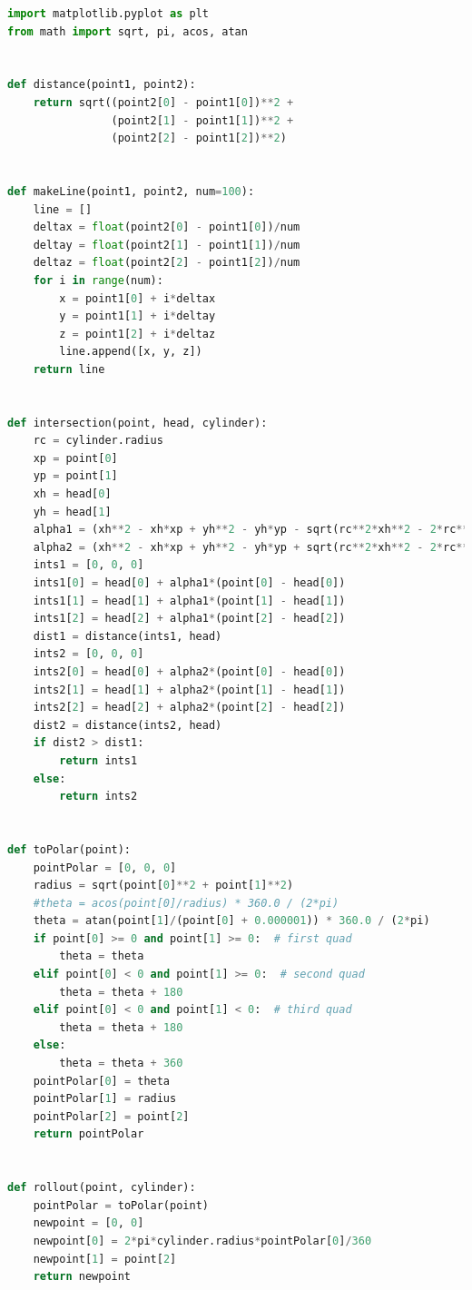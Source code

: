 \begin{lstlisting}[language=python]
import matplotlib.pyplot as plt
from math import sqrt, pi, acos, atan


def distance(point1, point2):
    return sqrt((point2[0] - point1[0])**2 +
                (point2[1] - point1[1])**2 +
                (point2[2] - point1[2])**2)


def makeLine(point1, point2, num=100):
    line = []
    deltax = float(point2[0] - point1[0])/num
    deltay = float(point2[1] - point1[1])/num
    deltaz = float(point2[2] - point1[2])/num
    for i in range(num):
        x = point1[0] + i*deltax
        y = point1[1] + i*deltay
        z = point1[2] + i*deltaz
        line.append([x, y, z])
    return line


def intersection(point, head, cylinder):
    rc = cylinder.radius
    xp = point[0]
    yp = point[1]
    xh = head[0]
    yh = head[1]
    alpha1 = (xh**2 - xh*xp + yh**2 - yh*yp - sqrt(rc**2*xh**2 - 2*rc**2*xh*xp + rc**2*xp**2 + rc**2*yh**2 - 2*rc**2*yh*yp + rc**2*yp**2 - xh**2*yp**2 + 2*xh*xp*yh*yp - xp**2*yh**2)) / (xh**2 - 2*xh*xp + xp**2 + yh**2 - 2*yh*yp + yp**2)
    alpha2 = (xh**2 - xh*xp + yh**2 - yh*yp + sqrt(rc**2*xh**2 - 2*rc**2*xh*xp + rc**2*xp**2 + rc**2*yh**2 - 2*rc**2*yh*yp + rc**2*yp**2 - xh**2*yp**2 + 2*xh*xp*yh*yp - xp**2*yh**2)) / (xh**2 - 2*xh*xp + xp**2 + yh**2 - 2*yh*yp + yp**2)
    ints1 = [0, 0, 0]
    ints1[0] = head[0] + alpha1*(point[0] - head[0])
    ints1[1] = head[1] + alpha1*(point[1] - head[1])
    ints1[2] = head[2] + alpha1*(point[2] - head[2])
    dist1 = distance(ints1, head)
    ints2 = [0, 0, 0]
    ints2[0] = head[0] + alpha2*(point[0] - head[0])
    ints2[1] = head[1] + alpha2*(point[1] - head[1])
    ints2[2] = head[2] + alpha2*(point[2] - head[2])
    dist2 = distance(ints2, head)
    if dist2 > dist1:
        return ints1
    else:
        return ints2


def toPolar(point):
    pointPolar = [0, 0, 0]
    radius = sqrt(point[0]**2 + point[1]**2)
    #theta = acos(point[0]/radius) * 360.0 / (2*pi)
    theta = atan(point[1]/(point[0] + 0.000001)) * 360.0 / (2*pi)
    if point[0] >= 0 and point[1] >= 0:  # first quad
        theta = theta
    elif point[0] < 0 and point[1] >= 0:  # second quad
        theta = theta + 180
    elif point[0] < 0 and point[1] < 0:  # third quad
        theta = theta + 180
    else:
        theta = theta + 360
    pointPolar[0] = theta
    pointPolar[1] = radius
    pointPolar[2] = point[2]
    return pointPolar


def rollout(point, cylinder):
    pointPolar = toPolar(point)
    newpoint = [0, 0]
    newpoint[0] = 2*pi*cylinder.radius*pointPolar[0]/360
    newpoint[1] = point[2]
    return newpoint



\end{lstlisting}
